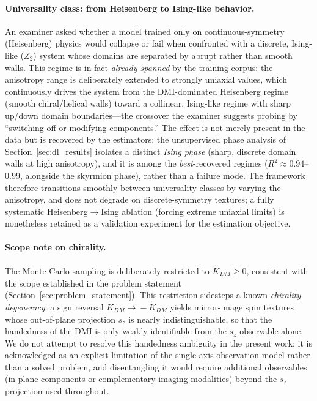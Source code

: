 \documentclass[letterpaper, 12, one column]{article}
\newcommand{\jc}[1]{\textcolor[rgb]{0.00,0.0,1.00}{#1}}
\begin{document}
\jc{\paragraph{Universality class: from Heisenberg to Ising-like behavior.} An examiner asked whether a model trained only on continuous-symmetry (Heisenberg) physics would collapse or fail when confronted with a discrete, Ising-like ($Z_2$) system whose domains are separated by abrupt rather than smooth walls. This regime is in fact \emph{already spanned} by the training corpus: the anisotropy range is deliberately extended to strongly uniaxial values, which continuously drives the system from the DMI-dominated Heisenberg regime (smooth chiral/helical walls) toward a collinear, Ising-like regime with sharp up/down domain boundaries---the crossover the examiner suggests probing by ``switching off or modifying components.'' The effect is not merely present in the data but is recovered by the estimators: the unsupervised phase analysis of Section~\ref{sec:dl_results} isolates a distinct \emph{Ising phase} (sharp, discrete domain walls at high anisotropy), and it is among the \emph{best}-recovered regimes ($R^2\approx0.94$--$0.99$, alongside the skyrmion phase), rather than a failure mode. The framework therefore transitions smoothly between universality classes by varying the anisotropy, and does not degrade on discrete-symmetry textures; a fully systematic Heisenberg$\to$Ising ablation (forcing extreme uniaxial limits) is nonetheless retained as a validation experiment for the estimation objective.}

\paragraph{Scope note on chirality.}
The Monte Carlo sampling is deliberately restricted to $\tilde{K}_{DM}\geq 0$, consistent with the scope established in the problem statement (Section~\ref{sec:problem_statement}). This restriction sidesteps a known \emph{chirality degeneracy}: a sign reversal $\tilde{K}_{DM}\!\rightarrow\!-\tilde{K}_{DM}$ yields mirror-image spin textures whose out-of-plane projection $s_z$ is nearly indistinguishable, so that the handedness of the DMI is only weakly identifiable from the $s_z$ observable alone. We do not attempt to resolve this handedness ambiguity in the present work; it is acknowledged as an explicit limitation of the single-axis observation model rather than a solved problem, and disentangling it would require additional observables (in-plane components or complementary imaging modalities) beyond the $s_z$ projection used throughout.
\end{document}
